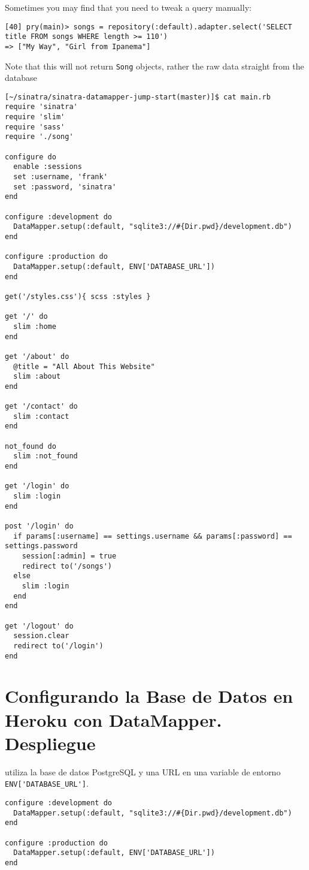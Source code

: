 Sometimes you may find that you need to tweak a query manually:
\begin{verbatim}
[40] pry(main)> songs = repository(:default).adapter.select('SELECT title FROM songs WHERE length >= 110')
=> ["My Way", "Girl from Ipanema"]
\end{verbatim}
Note that this will not return \verb|Song| objects, 
rather the raw data straight from the database


\begin{verbatim}
[~/sinatra/sinatra-datamapper-jump-start(master)]$ cat main.rb
require 'sinatra'
require 'slim'
require 'sass'
require './song'

configure do
  enable :sessions
  set :username, 'frank'
  set :password, 'sinatra'
end

configure :development do
  DataMapper.setup(:default, "sqlite3://#{Dir.pwd}/development.db")
end

configure :production do
  DataMapper.setup(:default, ENV['DATABASE_URL'])
end

get('/styles.css'){ scss :styles }

get '/' do
  slim :home
end

get '/about' do
  @title = "All About This Website"
  slim :about
end

get '/contact' do
  slim :contact
end

not_found do
  slim :not_found
end

get '/login' do
  slim :login
end

post '/login' do
  if params[:username] == settings.username && params[:password] == settings.password
    session[:admin] = true
    redirect to('/songs')
  else
    slim :login
  end
end

get '/logout' do
  session.clear
  redirect to('/login')
end
\end{verbatim}

\section{Configurando la Base de Datos en Heroku con DataMapper. Despliegue}

\Heroku{} utiliza la base de datos PostgreSQL y una URL en una variable 
de entorno \verb|ENV['DATABASE_URL']|.

\begin{verbatim}
configure :development do
  DataMapper.setup(:default, "sqlite3://#{Dir.pwd}/development.db")
end

configure :production do
  DataMapper.setup(:default, ENV['DATABASE_URL'])
end
\end{verbatim}

